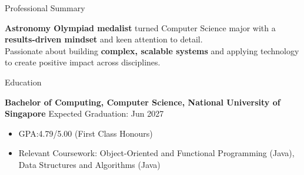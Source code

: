 \documentclass{phanuphat_srisukhawasu_resume} %
\begin{document}

\begin{rSection}{Professional Summary}

  {\textbf{Astronomy Olympiad medalist} turned Computer Science major with a \textbf{results-driven mindset} and keen attention to detail. \\ Passionate about building \textbf{complex, scalable systems} and applying technology to create positive impact across disciplines.}  

\end{rSection}


\begin{rSection}{Education}

  \textbf{Bachelor of Computing, Computer Science, National University of Singapore} \hfill {Expected Graduation: Jun 2027}
  \begin{itemize}
    \item GPA:\@ 4.79/5.00 (First Class Honours)
    \item Relevant Coursework: Object-Oriented and Functional Programming (Java), Data Structures and Algorithms (Java)
  \end{itemize}

\end{rSection}

\end{document}
